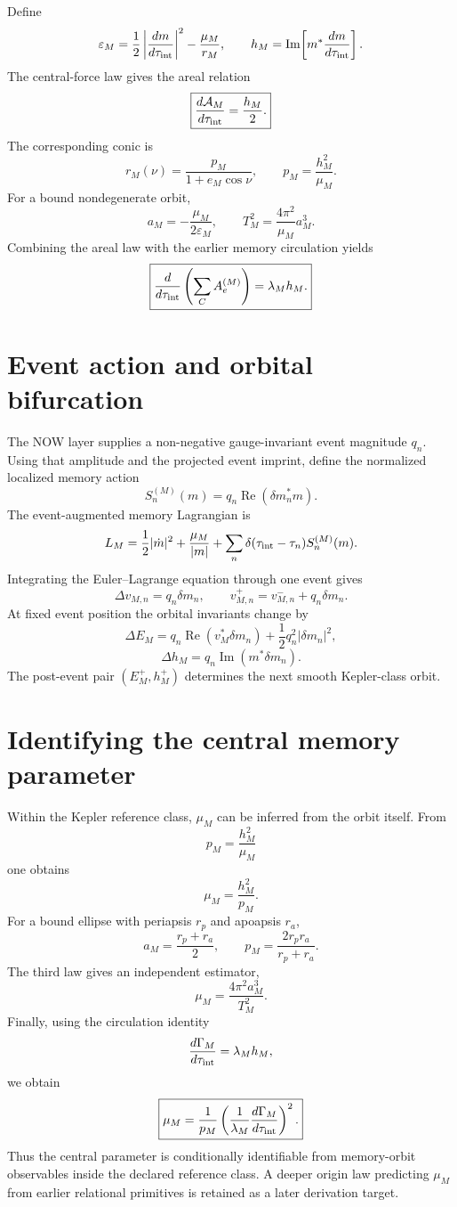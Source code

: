 \documentclass[11pt]{book}
\begin{document}
Define
\[
\varepsilon_M
=\frac12\left|\frac{dm}{d\tau_{\rm int}}\right|^2
-\frac{\mu_M}{r_M},
\qquad
h_M
=\operatorname{Im}\!\left[m^*\frac{dm}{d\tau_{\rm int}}\right].
\]
The central-force law gives the areal relation
\[
\boxed{
\frac{d\mathcal A_M}{d\tau_{\rm int}}
=\frac{h_M}{2}.
}
\]
The corresponding conic is
\[
r_M(\nu)
=\frac{p_M}{1+e_M\cos\nu},
\qquad
p_M=\frac{h_M^2}{\mu_M}.
\]
For a bound nondegenerate orbit,
\[
a_M=-\frac{\mu_M}{2\varepsilon_M},
\qquad
T_M^2=\frac{4\pi^2}{\mu_M}a_M^3.
\]
Combining the areal law with the earlier memory circulation yields
\[
\boxed{
\frac{d}{d\tau_{\rm int}}
\left(\sum_C A_e^{(M)}\right)
=\lambda_M h_M.
}
\]

\section{Event action and orbital bifurcation}

The NOW layer supplies a non-negative gauge-invariant event magnitude \(q_n\). Using that amplitude and the projected event imprint, define the normalized localized memory action
\[
\boxed{
S_n^{(M)}(m)
=q_n\operatorname{Re}(\delta m_n^*m).
}
\]
The event-augmented memory Lagrangian is
\[
L_M
=\frac12|\dot m|^2+\frac{\mu_M}{|m|}
+\sum_n\delta(\tau_{\rm int}-\tau_n)S_n^{(M)}(m).
\]
Integrating the Euler--Lagrange equation through one event gives
\[
\boxed{
\Delta v_{M,n}=q_n\delta m_n,
\qquad
v_{M,n}^+=v_{M,n}^-+q_n\delta m_n.
}
\]
At fixed event position the orbital invariants change by
\[
\boxed{
\Delta E_M
=q_n\operatorname{Re}(v_M^*\delta m_n)
+\frac12q_n^2|\delta m_n|^2,
}
\]
\[
\boxed{
\Delta h_M=q_n\operatorname{Im}(m^*\delta m_n).
}
\]
The post-event pair \((E_M^+,h_M^+)\) determines the next smooth Kepler-class orbit.

\section{Identifying the central memory parameter}

Within the Kepler reference class, \(\mu_M\) can be inferred from the orbit itself. From
\[
p_M=\frac{h_M^2}{\mu_M}
\]
one obtains
\[
\boxed{\mu_M=\frac{h_M^2}{p_M}}.
\]
For a bound ellipse with periapsis \(r_p\) and apoapsis \(r_a\),
\[
a_M=\frac{r_p+r_a}{2},
\qquad
p_M=\frac{2r_pr_a}{r_p+r_a}.
\]
The third law gives an independent estimator,
\[
\boxed{\mu_M=\frac{4\pi^2a_M^3}{T_M^2}}.
\]
Finally, using the circulation identity
\[
\frac{d\Gamma_M}{d\tau_{\rm int}}=\lambda_M h_M,
\]
we obtain
\[
\boxed{
\mu_M
=\frac{1}{p_M}
\left(
\frac{1}{\lambda_M}
\frac{d\Gamma_M}{d\tau_{\rm int}}
\right)^2.
}
\]
Thus the central parameter is conditionally identifiable from memory-orbit observables inside the declared reference class. A deeper origin law predicting \(\mu_M\) from earlier relational primitives is retained as a later derivation target.
\end{document}
